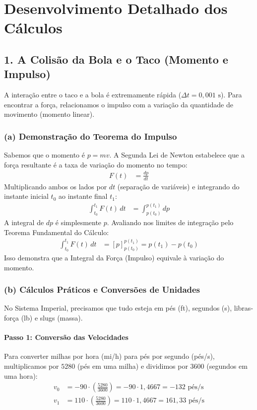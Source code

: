 \documentclass[12pt,a4paper]{article}
\begin{document}
\section{Desenvolvimento Detalhado dos Cálculos}

\subsection{1. A Colisão da Bola e o Taco (Momento e Impulso)}
A interação entre o taco e a bola é extremamente rápida ($\Delta t = 0{,}001\text{ s}$). Para encontrar a força, relacionamos o impulso com a variação da quantidade de movimento (momento linear).

\subsubsection*{(a) Demonstração do Teorema do Impulso}
Sabemos que o momento é $p = mv$. A Segunda Lei de Newton estabelece que a força resultante é a taxa de variação do momento no tempo:
\begin{align*}
    F(t) &= \frac{dp}{dt}
\end{align*}
Multiplicando ambos os lados por $dt$ (separação de variáveis) e integrando do instante inicial $t_0$ ao instante final $t_1$:
\begin{align*}
    \int_{t_0}^{t_1} F(t) \, dt &= \int_{p(t_0)}^{p(t_1)} dp
\end{align*}
A integral de $dp$ é simplesmente $p$. Avaliando nos limites de integração pelo Teorema Fundamental do Cálculo:
\begin{align*}
    \int_{t_0}^{t_1} F(t) \, dt &= [p]_{p(t_0)}^{p(t_1)} = p(t_1) - p(t_0)
\end{align*}
Isso demonstra que a Integral da Força (Impulso) equivale à variação do momento.

\subsubsection*{(b) Cálculos Práticos e Conversões de Unidades}
No Sistema Imperial, precisamos que tudo esteja em pés (ft), segundos (s), libras-força (lb) e slugs (massa).

\paragraph{Passo 1: Conversão das Velocidades}
Para converter milhas por hora (mi/h) para pés por segundo (pés/s), multiplicamos por $5280$ (pés em uma milha) e dividimos por $3600$ (segundos em uma hora):
\begin{align*}
    v_0 &= -90 \cdot \left(\frac{5280}{3600}\right) = -90 \cdot 1{,}4667 = -132\text{ pés/s} \\
    v_1 &= 110 \cdot \left(\frac{5280}{3600}\right) = 110 \cdot 1{,}4667 = 161{,}33\text{ pés/s} 
\end{align*}
\end{document}

